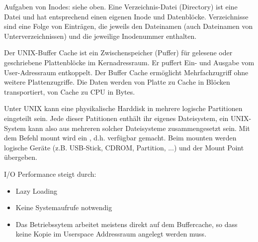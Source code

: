 \begin{answer}
  Aufgaben von Inodes: siehe oben. Eine Verzeichnis-Datei (Directory) ist eine Datei und hat entsprechend
  einen eigenen Inode und Datenblöcke. Verzeichnisse sind eine Folge von Einträgen, die
  jeweils den Dateinamen (auch Dateinamen von Unterverzeichnissen) und die jeweilige Inodenummer
  enthalten.
\end{answer}

\begin{answer}
  Der UNIX-Buffer Cache ist ein Zwischenspeicher (Puffer) für gelesene oder geschriebene Plattenblöcke im Kernadressraum. Er puffert Ein- und Ausgabe vom User-Adressraum entkoppelt. Der Buffer Cache ermöglicht Mehrfachzugriff ohne weitere Plattenzugriffe. Die Daten werden von Platte zu Cache in Blöcken transportiert, von Cache zu CPU in Bytes.
\end{answer}

\begin{answer}
  Unter UNIX kann eine physikalische Harddisk in mehrere logische Partitionen eingeteilt sein. Jede dieser Patitionen enthält ihr eigenes Dateisystem, ein UNIX-System kann also aus mehreren solcher Dateisysteme zusammengesetzt sein. Mit dem Befehl mount wird ein , d.h. verfügbar gemacht. Beim mounten werden logische Geräte (z.B. USB-Stick, CDROM, Partition, ...) und der Mount Point übergeben.
\end{answer}

\begin{answer}
  I/O Performance steigt durch:

  \begin{itemize}
  \item Lazy Loading 
  \item Keine Systemaufrufe notwendig
  \item Das Betriebssytem arbeitet meistens direkt auf dem Buffercache, so dass keine Kopie im Userspace Addressraum angelegt werden muss.
  \end{itemize}

\end{answer}

